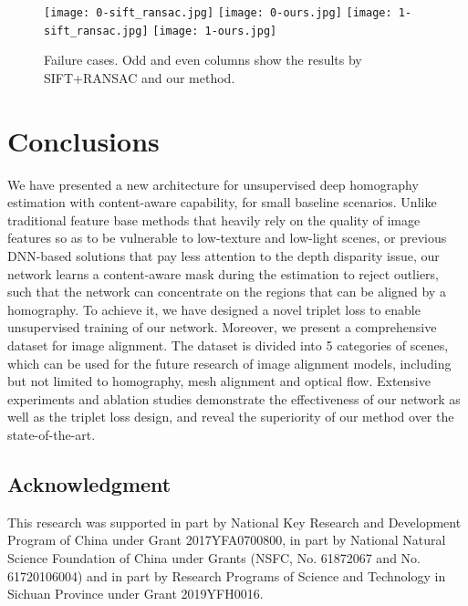 \documentclass[runningheads]{llncs}
\begin{document}
\begin{figure}[t]
  \centering
  \texttt{[image: 0-sift\_ransac.jpg]}
  \texttt{[image: 0-ours.jpg]}
  \texttt{[image: 1-sift\_ransac.jpg]}
  \texttt{[image: 1-ours.jpg]}
  \caption{Failure cases. Odd and even columns show the results by SIFT+RANSAC and our method.}\label{fig:failure-case}
\end{figure}



\section{Conclusions}\label{sec:conclu}

We have presented a new architecture for unsupervised deep homography estimation with content-aware capability, for small baseline scenarios. Unlike traditional feature base methods that heavily rely on the quality of image features so as to be vulnerable to low-texture and low-light scenes, or previous DNN-based solutions that pay less attention to the depth disparity issue, our network learns a content-aware mask during the estimation to reject outliers, such that the network can concentrate on the regions that can be aligned by a homography. To achieve it, we have designed a novel triplet loss to enable unsupervised training of our network. Moreover, we present a comprehensive dataset for image alignment. The dataset is divided into 5 categories of scenes, which can be used for the future research of image alignment models, including but not limited to homography, mesh alignment and optical flow. Extensive experiments and ablation studies demonstrate the effectiveness of our network as well as the triplet loss design, and reveal the superiority of our method over the state-of-the-art.





\subsection*{Acknowledgment}
This research was supported in part by National Key Research and Development Program of China under Grant 2017YFA0700800, in part by National Natural Science Foundation of China under Grants (NSFC, No. 61872067 and No. 61720106004) and in part by Research Programs of Science and Technology in Sichuan Province under Grant 2019YFH0016.






\end{document}
